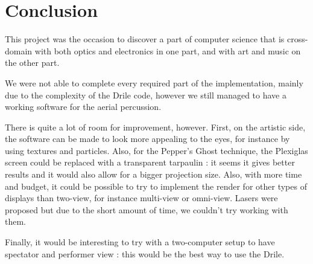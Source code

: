 \chapter{Conclusion}
This project was the occasion to discover a part of computer science that is cross-domain with both optics and electronics in one part, and with art and music on the other part.

We were not able to complete every required part of the implementation, mainly due to the complexity of the Drile code, however we still managed to have a working software for the aerial percussion.

There is quite a lot of room for improvement, however. 
First, on the artistic side, the software can be made to look more appealing to the eyes, for instance by using textures and particles.
Also, for the Pepper's Ghost technique, the Plexiglas screen could be replaced with a transparent tarpaulin : it seems it gives better results and it would also allow for a bigger projection size.
Also, with more time and budget, it could be possible to try to implement the render for other types of displays than two-view, for instance multi-view or omni-view. Lasers were proposed but due to the short amount of time, we couldn't try working with them.

Finally, it would be interesting to try with a two-computer setup to have spectator and performer view : this would be the best way to use the Drile.